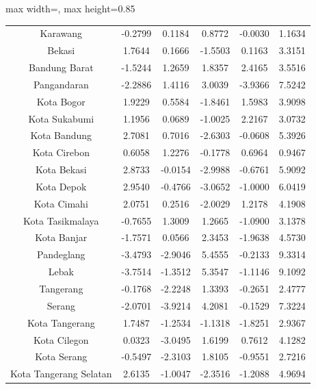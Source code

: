 \begin{table}[H]
\begin{adjustbox}{max width=\textwidth, max height=0.85\textheight}
\begin{tabular}{|c|c|c|c|c|c|}
Karawang & -0.2799 & 0.1184 & 0.8772 & -0.0030 & 1.1634 \\
Bekasi & 1.7644 & 0.1666 & -1.5503 & 0.1163 & 3.3151 \\
Bandung Barat & -1.5244 & 1.2659 & 1.8357 & 2.4165 & 3.5516 \\
Pangandaran & -2.2886 & 1.4116 & 3.0039 & -3.9366 & 7.5242 \\
Kota Bogor & 1.9229 & 0.5584 & -1.8461 & 1.5983 & 3.9098 \\
Kota Sukabumi & 1.1956 & 0.0689 & -1.0025 & 2.2167 & 3.0732 \\
Kota Bandung & 2.7081 & 0.7016 & -2.6303 & -0.0608 & 5.3926 \\
Kota Cirebon & 0.6058 & 1.2276 & -0.1778 & 0.6964 & 0.9467 \\
Kota Bekasi & 2.8733 & -0.0154 & -2.9988 & -0.6761 & 5.9092 \\
Kota Depok & 2.9540 & -0.4766 & -3.0652 & -1.0000 & 6.0419 \\
Kota Cimahi & 2.0751 & 0.2516 & -2.0029 & 1.2178 & 4.1908 \\
Kota Tasikmalaya & -0.7655 & 1.3009 & 1.2665 & -1.0900 & 3.1378 \\
Kota Banjar & -1.7571 & 0.0566 & 2.3453 & -1.9638 & 4.5730 \\
Pandeglang & -3.4793 & -2.9046 & 5.4555 & -0.2133 & 9.3314 \\
Lebak & -3.7514 & -1.3512 & 5.3547 & -1.1146 & 9.1092 \\
Tangerang & -0.1768 & -2.2248 & 1.3393 & -0.2651 & 2.4777 \\
Serang & -2.0701 & -3.9214 & 4.2081 & -0.1529 & 7.3224 \\
Kota Tangerang & 1.7487 & -1.2534 & -1.1318 & -1.8251 & 2.9367 \\
Kota Cilegon & 0.0323 & -3.0495 & 1.6199 & 0.7612 & 4.1282 \\
Kota Serang & -0.5497 & -2.3103 & 1.8105 & -0.9551 & 2.7216 \\
Kota Tangerang Selatan & 2.6135 & -1.0047 & -2.3516 & -1.2088 & 4.9694 \\
\hline
\end{tabular}
\end{adjustbox}
\end{table}